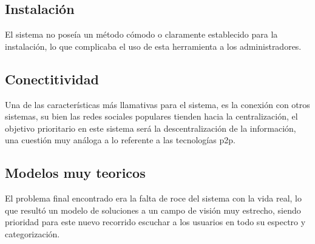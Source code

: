 \subsection{Instalación}
El sistema no poseía un método cómodo o claramente establecido para la instalación, lo que complicaba el uso de esta
herramienta a los administradores.

\subsection{Conectitividad}
Una de las características más llamativas para el sistema, es la conexión con otros sistemas, su bien las redes sociales
populares tienden hacia la centralización, el objetivo prioritario en este sistema será la descentralización de la
información, una cuestión muy análoga a lo referente a las tecnologías p2p.

\subsection{Modelos muy teoricos}
El problema final encontrado era la falta de roce del sistema con la vida real, lo que resultó un modelo de soluciones a
un campo de visión muy estrecho, siendo prioridad para este nuevo recorrido escuchar a los usuarios en todo su espectro
y categorización.
